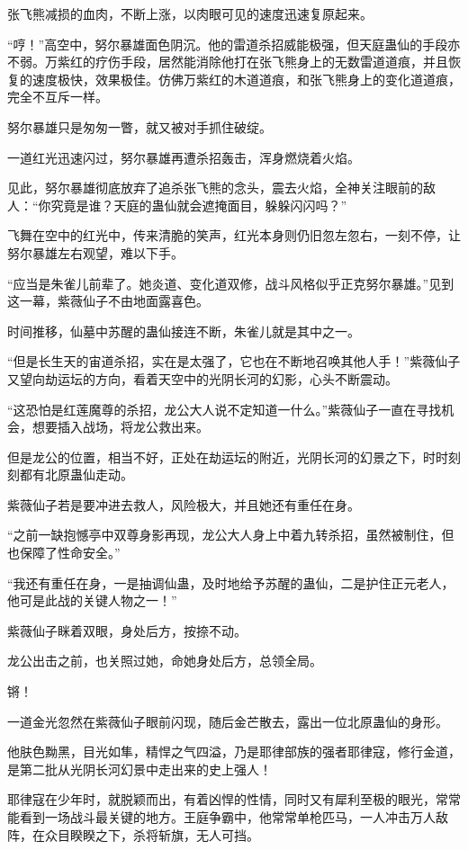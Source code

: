 \begin{this_body}
张飞熊减损的血肉，不断上涨，以肉眼可见的速度迅速复原起来。

“哼！”高空中，努尔暴雄面色阴沉。他的雷道杀招威能极强，但天庭蛊仙的手段亦不弱。万紫红的疗伤手段，居然能消除他打在张飞熊身上的无数雷道道痕，并且恢复的速度极快，效果极佳。仿佛万紫红的木道道痕，和张飞熊身上的变化道道痕，完全不互斥一样。

努尔暴雄只是匆匆一瞥，就又被对手抓住破绽。

一道红光迅速闪过，努尔暴雄再遭杀招轰击，浑身燃烧着火焰。

见此，努尔暴雄彻底放弃了追杀张飞熊的念头，震去火焰，全神关注眼前的敌人：“你究竟是谁？天庭的蛊仙就会遮掩面目，躲躲闪闪吗？”

飞舞在空中的红光中，传来清脆的笑声，红光本身则仍旧忽左忽右，一刻不停，让努尔暴雄左右观望，难以下手。

“应当是朱雀儿前辈了。她炎道、变化道双修，战斗风格似乎正克努尔暴雄。”见到这一幕，紫薇仙子不由地面露喜色。

时间推移，仙墓中苏醒的蛊仙接连不断，朱雀儿就是其中之一。

“但是长生天的宙道杀招，实在是太强了，它也在不断地召唤其他人手！”紫薇仙子又望向劫运坛的方向，看着天空中的光阴长河的幻影，心头不断震动。

“这恐怕是红莲魔尊的杀招，龙公大人说不定知道一什么。”紫薇仙子一直在寻找机会，想要插入战场，将龙公救出来。

但是龙公的位置，相当不好，正处在劫运坛的附近，光阴长河的幻景之下，时时刻刻都有北原蛊仙走动。

紫薇仙子若是要冲进去救人，风险极大，并且她还有重任在身。

“之前一缺抱憾亭中双尊身影再现，龙公大人身上中着九转杀招，虽然被制住，但也保障了性命安全。”

“我还有重任在身，一是抽调仙蛊，及时地给予苏醒的蛊仙，二是护住正元老人，他可是此战的关键人物之一！”

紫薇仙子眯着双眼，身处后方，按捺不动。

龙公出击之前，也关照过她，命她身处后方，总领全局。

锵！

一道金光忽然在紫薇仙子眼前闪现，随后金芒散去，露出一位北原蛊仙的身形。

他肤色黝黑，目光如隼，精悍之气四溢，乃是耶律部族的强者耶律寇，修行金道，是第二批从光阴长河幻景中走出来的史上强人！

耶律寇在少年时，就脱颖而出，有着凶悍的性情，同时又有犀利至极的眼光，常常能看到一场战斗最关键的地方。王庭争霸中，他常常单枪匹马，一人冲击万人敌阵，在众目睽睽之下，杀将斩旗，无人可挡。


\end{this_body}

